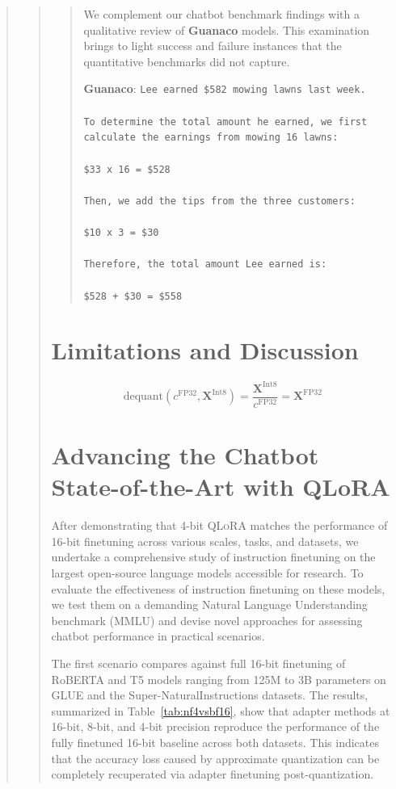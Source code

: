 \begin{quote}
\begin{quote}
\begin{quote}
We complement our chatbot benchmark findings with a qualitative review of \textbf{Guanaco} models. This examination brings to light success and failure instances that the quantitative benchmarks did not capture.

    \textbf{Guanaco}: \texttt{Lee earned \$582 mowing lawns last week. \\ \\ To determine the total amount he earned, we first calculate the earnings from mowing 16 lawns: \\ \\  \$33 x 16 = \$528 \\ \\ Then, we add the tips from the three customers: \\  \\ \$10 x 3 = \$30 \\ \\ Therefore, the total amount Lee earned is: \\ \\ \$528 + \$30 = \$558}
\end{quote}

\section{Limitations and Discussion}

\begin{equation}
    \text{dequant}(c^{\text{FP32}}, \mathbf{X}^{\text{Int8}}) = \frac{\mathbf{X}^{\text{Int8}}}{c^{\text{FP32}}} = \mathbf{X}^{\text{FP32}}
\end{equation}

\section{Advancing the Chatbot State-of-the-Art with QLoRA}
\label{sec:pushing}
After demonstrating that 4-bit \textsc{QLoRA} matches the performance of 16-bit finetuning across various scales, tasks, and datasets, we undertake a comprehensive study of instruction finetuning on the largest open-source language models accessible for research. To evaluate the effectiveness of instruction finetuning on these models, we test them on a demanding Natural Language Understanding benchmark (MMLU) and devise novel approaches for assessing chatbot performance in practical scenarios.

The first scenario compares against full 16-bit finetuning of RoBERTA and T5 models ranging from 125M to 3B parameters on GLUE and the Super-NaturalInstructions datasets. The results, summarized in Table~\ref{tab:nf4vsbf16}, show that adapter methods at 16-bit, 8-bit, and 4-bit precision reproduce the performance of the fully finetuned 16-bit baseline across both datasets. This indicates that the accuracy loss caused by approximate quantization can be completely recuperated via adapter finetuning post-quantization.


\end{quote}
\end{quote}
